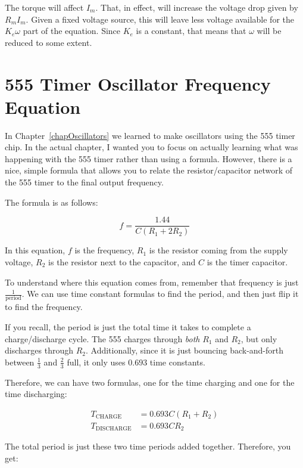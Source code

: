 The torque will affect $I_m$.
That, in effect, will increase the voltage drop given by $R_m I_m$.
Given a fixed voltage source, this will leave less voltage available for the $K_e \omega$ part of the equation.
Since $K_e$ is a constant, that means that $\omega$ will be reduced to some extent.


\section{555 Timer Oscillator Frequency Equation}
\label{apOscillatorFreq}

In Chapter~\ref{chapOscillators} we learned to make oscillators using the 555 timer chip.
In the actual chapter, I wanted you to focus on actually learning what was happening with the 555 timer rather than using a formula.
However, there is a nice, simple formula that allows you to relate the resistor/capacitor network of the 555 timer to the final output frequency.

The formula is as follows:

\begin{equation}
f = \frac{1.44}{C(R_1 + 2 R_2)}
\end{equation}

In this equation, $f$ is the frequency, $R_1$ is the resistor coming from the supply voltage, $R_2$ is the resistor next to the capacitor, and $C$ is the timer capacitor.

To understand where this equation comes from, remember that frequency is just $\frac{1}{\textrm{period}}$.
We can use time constant formulas to find the period, and then just flip it to find the frequency.

If you recall, the period is just the total time it takes to complete a charge/discharge cycle.  
The 555 charges through \emph{both} $R_1$ and $R_2$, but only discharges through $R_2$.
Additionally, since it is just bouncing back-and-forth between $\frac{1}{3}$ and $\frac{2}{3}$ full, it only uses $0.693$ time constants.

Therefore, we can have two formulas, one for the time charging and one for the time discharging:

\begin{align*}
T_{\text{CHARGE}} &= 0.693 C (R_1 + R_2) \\
T_{\text{DISCHARGE}} &= 0.693 C R_2
\end{align*}

The total period is just these two time periods added together.
Therefore, you get:

